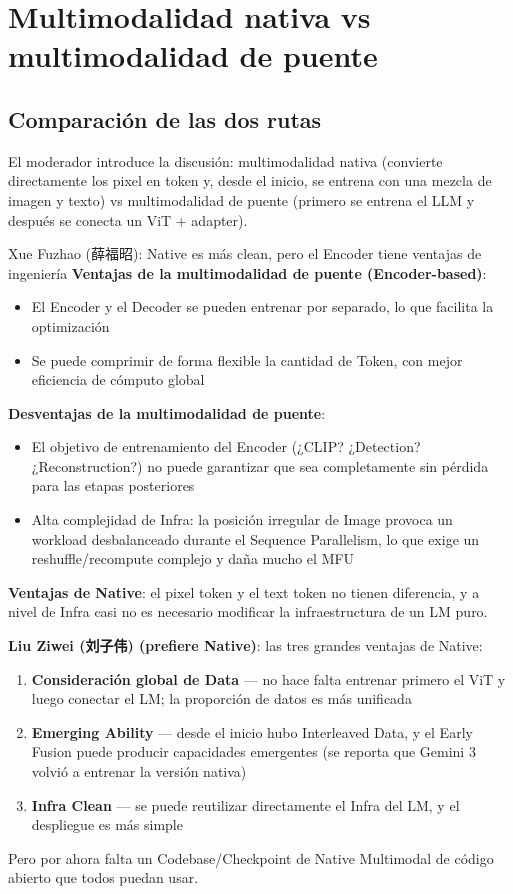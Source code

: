 \section{Multimodalidad nativa vs multimodalidad de puente}

\subsection{Comparación de las dos rutas}

El moderador introduce la discusión: multimodalidad nativa (convierte directamente los pixel en token y, desde el inicio, se entrena con una mezcla de imagen y texto) vs multimodalidad de puente (primero se entrena el LLM y después se conecta un ViT + adapter).

\begin{importantbox}{Xue Fuzhao (薛福昭): Native es más clean, pero el Encoder tiene ventajas de ingeniería}
\textbf{Ventajas de la multimodalidad de puente (Encoder-based)}:
\begin{itemize}
  \item El Encoder y el Decoder se pueden entrenar por separado, lo que facilita la optimización
  \item Se puede comprimir de forma flexible la cantidad de Token, con mejor eficiencia de cómputo global
\end{itemize}
\textbf{Desventajas de la multimodalidad de puente}:
\begin{itemize}
  \item El objetivo de entrenamiento del Encoder (¿CLIP? ¿Detection? ¿Reconstruction?) no puede garantizar que sea completamente sin pérdida para las etapas posteriores
  \item Alta complejidad de Infra: la posición irregular de Image provoca un workload desbalanceado durante el Sequence Parallelism, lo que exige un reshuffle/recompute complejo y daña mucho el MFU
\end{itemize}
\textbf{Ventajas de Native}: el pixel token y el text token no tienen diferencia, y a nivel de Infra casi no es necesario modificar la infraestructura de un LM puro.
\end{importantbox}

\textbf{Liu Ziwei (刘子伟) (prefiere Native)}: las tres grandes ventajas de Native:
\begin{enumerate}
  \item \textbf{Consideración global de Data} — no hace falta entrenar primero el ViT y luego conectar el LM; la proporción de datos es más unificada
  \item \textbf{Emerging Ability} — desde el inicio hubo Interleaved Data, y el Early Fusion puede producir capacidades emergentes (se reporta que Gemini 3 volvió a entrenar la versión nativa)
  \item \textbf{Infra Clean} — se puede reutilizar directamente el Infra del LM, y el despliegue es más simple
\end{enumerate}
Pero por ahora falta un Codebase/Checkpoint de Native Multimodal de código abierto que todos puedan usar.

